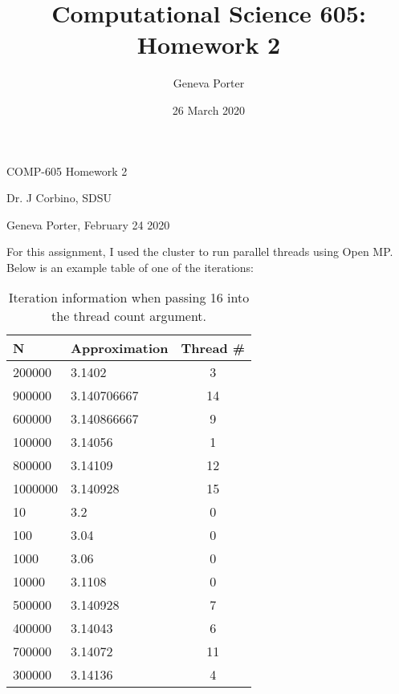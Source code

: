 \documentclass[12pt]{article}
\title{Computational Science 605: Homework 2}
\author{Geneva Porter}
\date{26 March 2020}
\begin{document}
\begin{center}
	{\Huge COMP-605 Homework 2}
	
	\vspace{5mm}
	
	{\Large Dr. J Corbino, SDSU}
	
	\vspace{5mm}
	
	{\large Geneva Porter, February 24 2020}
	
	\vspace{5mm}
\end{center}

For this assignment, I used the cluster to run parallel threads using Open MP. Below is an example table of one of the iterations:

\begin{table}[h]
    \centering
    \begin{tabular}{|l|l|c|} \hline
    N & Approximation & Thread # \\ \hline
    200000         &3.1402         &3         \\ \hline      
    900000         &3.140706667    &14     \\ \hline         
    600000         &3.140866667    &9      \\ \hline         
    100000         &3.14056        &1      \\ \hline         
    800000         &3.14109        &12      \\ \hline        
    1000000        &3.140928       &15      \\ \hline        
    10             &3.2            &0       \\ \hline        
    100            &3.04           &0        \\ \hline       
    1000           &3.06           &0        \\ \hline       
    10000          &3.1108         &0       \\ \hline        
    500000         &3.140928       &7        \\ \hline       
    400000         &3.14043        &6        \\ \hline       
    700000         &3.14072        &11        \\ \hline      
    300000         &3.14136        &4   \\ \hline
    \end{tabular}
	\caption{Iteration information when passing 16 into the thread count argument.}
\end{table}
\end{document}
